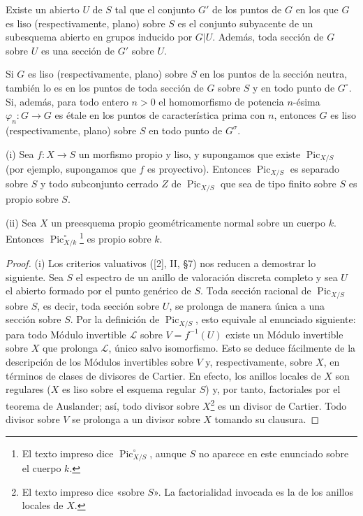  Existe un abierto $U$ de $S$ tal que el conjunto
$G'$ de los puntos de $G$ en los que $G$ es liso (respectivamente, plano) sobre
$S$ es el conjunto subyacente de un subesquema abierto en grupos inducido por
$G|U$. Además, toda sección de $G$ sobre $U$ es una sección de $G'$ sobre $U$.

 Si $G$ es liso (respectivamente, plano) sobre $S$ en
los puntos de la sección neutra, también lo es en los puntos de toda sección de
$G$ sobre $S$ y en todo punto de $G^\circ$. Si, además, para todo entero $n>0$
el homomorfismo de potencia $n$-ésima
$\varphi_n:G\longrightarrow G$ es étale en los puntos de característica prima
con $n$, entonces $G$ es liso (respectivamente, plano) sobre $S$ en todo punto
de $G^\sigma$.



\noindent(i) Sea $f:X\longrightarrow S$ un morfismo propio y liso, y
supongamos que existe $\operatorname{Pic}_{X/S}$ (por ejemplo, supongamos que
$f$ es proyectivo). Entonces $\operatorname{Pic}_{X/S}$ es separado sobre $S$
y todo subconjunto cerrado $Z$ de $\operatorname{Pic}_{X/S}$ que sea de tipo
finito sobre $S$ es propio sobre $S$.

\noindent(ii) Sea $X$ un preesquema propio geométricamente normal sobre un
cuerpo $k$. Entonces $\operatorname{Pic}_{X/k}^\circ$\footnote{El texto
impreso dice $\operatorname{Pic}_{X/S}^\circ$, aunque $S$ no aparece en este
enunciado sobre el cuerpo $k$.} es propio sobre $k$.

\begin{proof}
(i) Los criterios valuativos ([2], II, §7) nos reducen a demostrar lo
siguiente. Sea $S$ el espectro de un anillo de valoración discreta completo y
sea $U$ el abierto formado por el punto genérico de $S$. Toda sección racional
de $\operatorname{Pic}_{X/S}$ sobre $S$, es decir, toda sección sobre $U$, se
prolonga de manera única a una sección sobre $S$. Por la definición de
$\operatorname{Pic}_{X/S}$, esto equivale al enunciado siguiente: para todo
Módulo invertible $\mathcal L$ sobre $V=f^{-1}(U)$ existe un Módulo invertible sobre $X$
que prolonga $\mathcal L$, único salvo isomorfismo. Esto se deduce fácilmente
de la descripción de los Módulos invertibles sobre $V$ y, respectivamente, sobre
$X$, en términos de clases de divisores de Cartier. En efecto, los anillos
locales de $X$ son regulares ($X$ es liso sobre el esquema regular $S$) y, por
tanto, factoriales por el teorema de Auslander; así, todo divisor sobre
$X$\footnote{El texto impreso dice «sobre $S$». La factorialidad invocada es
la de los anillos locales de $X$.} es un divisor de Cartier. Todo divisor sobre
$V$ se prolonga a un divisor sobre $X$ tomando su clausura.
\end{proof}

